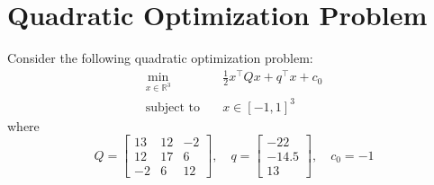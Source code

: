 \documentclass{article}
\begin{document}
\section{Quadratic Optimization Problem}

Consider the following quadratic optimization problem:
\begin{align*}
\min_{x \in \mathbb{R}^3} \quad & \frac{1}{2} x^\top Q x + q^\top x + c_0 \\
\text{subject to} \quad & x \in [-1, 1]^3
\end{align*}
where
\[
Q = \begin{bmatrix}
13 & 12 & -2 \\
12 & 17 & 6 \\
-2 & 6 & 12
\end{bmatrix}, \quad
q = \begin{bmatrix}
-22 \\
-14.5 \\
13
\end{bmatrix}, \quad
c_0 = -1
\]
\end{document}
